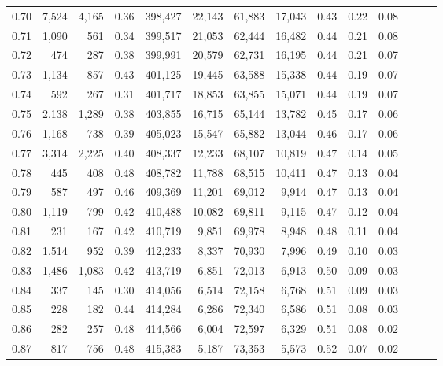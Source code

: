 \begin{tabular}{rrrrrrrrrrrrrr}
0.70 &   7,524 &  4,165 &  0.36 &  398,427 &   22,143 &  61,883 &  17,043 &  0.43 &  0.22 &      0.08 \\
0.71 &   1,090 &    561 &  0.34 &  399,517 &   21,053 &  62,444 &  16,482 &  0.44 &  0.21 &      0.08 \\
0.72 &     474 &    287 &  0.38 &  399,991 &   20,579 &  62,731 &  16,195 &  0.44 &  0.21 &      0.07 \\
0.73 &   1,134 &    857 &  0.43 &  401,125 &   19,445 &  63,588 &  15,338 &  0.44 &  0.19 &      0.07 \\
0.74 &     592 &    267 &  0.31 &  401,717 &   18,853 &  63,855 &  15,071 &  0.44 &  0.19 &      0.07 \\
0.75 &   2,138 &  1,289 &  0.38 &  403,855 &   16,715 &  65,144 &  13,782 &  0.45 &  0.17 &      0.06 \\
0.76 &   1,168 &    738 &  0.39 &  405,023 &   15,547 &  65,882 &  13,044 &  0.46 &  0.17 &      0.06 \\
0.77 &   3,314 &  2,225 &  0.40 &  408,337 &   12,233 &  68,107 &  10,819 &  0.47 &  0.14 &      0.05 \\
0.78 &     445 &    408 &  0.48 &  408,782 &   11,788 &  68,515 &  10,411 &  0.47 &  0.13 &      0.04 \\
0.79 &     587 &    497 &  0.46 &  409,369 &   11,201 &  69,012 &   9,914 &  0.47 &  0.13 &      0.04 \\
0.80 &   1,119 &    799 &  0.42 &  410,488 &   10,082 &  69,811 &   9,115 &  0.47 &  0.12 &      0.04 \\
0.81 &     231 &    167 &  0.42 &  410,719 &    9,851 &  69,978 &   8,948 &  0.48 &  0.11 &      0.04 \\
0.82 &   1,514 &    952 &  0.39 &  412,233 &    8,337 &  70,930 &   7,996 &  0.49 &  0.10 &      0.03 \\
0.83 &   1,486 &  1,083 &  0.42 &  413,719 &    6,851 &  72,013 &   6,913 &  0.50 &  0.09 &      0.03 \\
0.84 &     337 &    145 &  0.30 &  414,056 &    6,514 &  72,158 &   6,768 &  0.51 &  0.09 &      0.03 \\
0.85 &     228 &    182 &  0.44 &  414,284 &    6,286 &  72,340 &   6,586 &  0.51 &  0.08 &      0.03 \\
0.86 &     282 &    257 &  0.48 &  414,566 &    6,004 &  72,597 &   6,329 &  0.51 &  0.08 &      0.02 \\
0.87 &     817 &    756 &  0.48 &  415,383 &    5,187 &  73,353 &   5,573 &  0.52 &  0.07 &      0.02 \\

\end{tabular}
